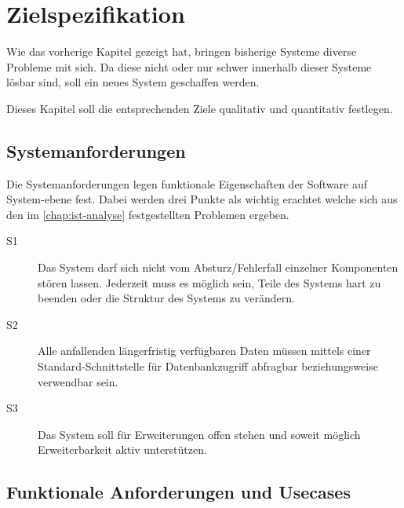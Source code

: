 \chapter{Zielspezifikation}
\label{chap:target}
Wie das vorherige Kapitel gezeigt hat,
bringen bisherige Systeme diverse Probleme mit sich.
Da diese nicht oder nur schwer innerhalb dieser Systeme lösbar sind,
soll ein neues System geschaffen werden.

Dieses Kapitel soll die entsprechenden Ziele
qualitativ und quantitativ festlegen.






\section{Systemanforderungen}
\label{sec:target:systemanforderungen}

Die Systemanforderungen legen funktionale Eigenschaften der Software auf System-ebene fest.
Dabei werden drei Punkte als wichtig erachtet welche sich aus den im \cref{chap:ist-analyse} festgestellten Problemen ergeben.


\begin{description}

\item[S1]
  Das System darf sich nicht vom Absturz/Fehlerfall
  einzelner Komponenten stören lassen. Jederzeit muss
  es möglich sein, Teile des Systems hart zu beenden
  oder die Struktur des Systems zu verändern.

\item[S2]
  Alle anfallenden längerfristig verfügbaren Daten müssen
  mittels einer Standard-Schnittstelle für
  Datenbankzugriff abfragbar beziehungsweise verwendbar sein.

\item[S3]
  Das System soll für Erweiterungen offen stehen
  und soweit möglich Erweiterbarkeit aktiv unterstützen.
\end{description}


\section{Funktionale Anforderungen und Usecases}
\label{sec:target:usecases}

